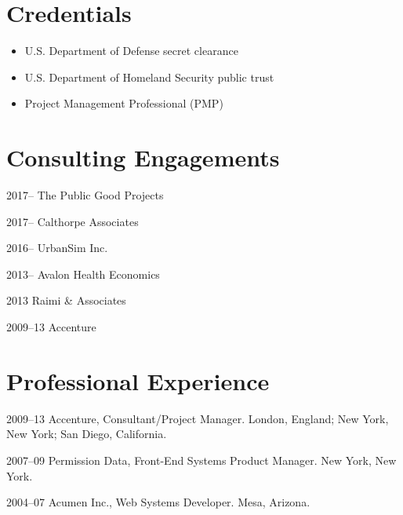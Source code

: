 \documentclass{academiccv}
\begin{document}
\section*{Credentials}

\begin{itemize}
	
\item U.S. Department of Defense secret clearance

\item U.S. Department of Homeland Security public trust

\item Project Management Professional (PMP)

\end{itemize}



\section*{Consulting Engagements}

\begin{tablist}

\item[2017--]   \tab The Public Good Projects	

\item[2017--]   \tab Calthorpe Associates

\item[2016--]   \tab UrbanSim Inc.

\item[2013--]   \tab Avalon Health Economics

\item[2013]     \tab Raimi \& Associates

\item[2009--13] \tab Accenture

\end{tablist}



\section*{Professional Experience}

\begin{tablist}
	
\item[2009--13] \tab Accenture, Consultant/Project Manager. London, England; New York, New York; San Diego, California.

\item[2007--09] \tab Permission Data, Front-End Systems Product Manager. New York, New York.

\item[2004--07] \tab Acumen Inc., Web Systems Developer. Mesa, Arizona.

\end{tablist}
\end{document}
